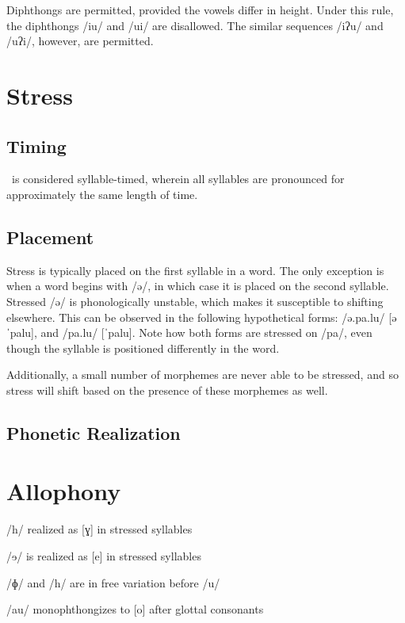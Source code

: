 Diphthongs are permitted, provided the vowels differ in height. Under this rule, the diphthongs /iu/ and /ui/ are disallowed. The similar sequences /iʔu/ and /uʔi/, however, are permitted.

\section{Stress}
\subsection{Timing}
\langname\ is considered syllable-timed, wherein all syllables are pronounced for approximately the same length of time.

\subsection{Placement}
Stress is typically placed on the first syllable in a word. The only exception is when a word begins with /ə/, in which case it is placed on the second syllable. Stressed /ə/ is phonologically unstable, which makes it susceptible to shifting elsewhere. This can be observed in the following hypothetical forms: /ə.pa.lu/ [əˈpalu], and /pa.lu/ [ˈpalu]. Note how both forms are stressed on /pa/, even though the syllable is positioned differently in the word.

Additionally, a small number of morphemes are never able to be stressed, and so stress will shift based on the presence of these morphemes as well.

\subsection{Phonetic Realization}

\section{Allophony} %

/h/ realized as [ɣ] in stressed syllables


/ɘ/ is realized as [e] in stressed syllables


/ɸ/ and /h/ are in free variation before /u/

/au/ monophthongizes to [o] after glottal consonants

